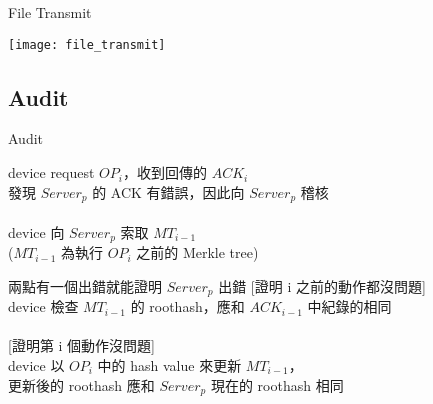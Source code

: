 \begin{frame}{File Transmit}
	\begin{center}
		\texttt{[image: file\_transmit]}
	\end{center}
\end{frame}

\subsection{Audit}
\begin{frame}{Audit}
	\begin{block}{}
		\centering
		device request $OP_i$，收到回傳的 $ACK_i$\\
		發現 $Server_p$ 的 ACK 有錯誤，因此向 $Server_p$ 稽核\\
		~\\
		device 向 $Server_p$ 索取 $MT_{i-1}$\\
		($MT_{i-1}$ 為執行 $OP_i$ 之前的 Merkle tree)
	\end{block}
	\begin{alertblock}{ 兩點有一個出錯就能證明 $Server_p$ 出錯}
    	\alert{[證明 i 之前的動作都沒問題]}\\
		 device 檢查 $MT_{i-1}$ 的 roothash，應和 $ACK_{i-1}$ 中紀錄的相同\\
		~\\                   
        \alert{[證明第 i 個動作沒問題]}\\             
		 device 以 $OP_i$ 中的 hash value 來更新 $MT_{i-1}$，\\
					 \tab{}更新後的 roothash 應和 $Server_p$ 現在的 roothash 相同
	\end{alertblock}	
\end{frame}